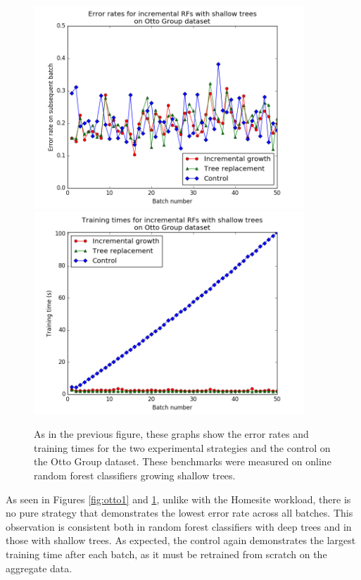 \begin{figure}
  \centering
  \includegraphics[width=4.0in]{otto1}\\
  \includegraphics[width=4.0in]{otto2}
  \caption{As in the previous figure, these graphs show the error rates and
    training times for the two experimental strategies and the control on the
    Otto Group dataset. These benchmarks were measured on online random forest
  classifiers growing shallow trees.}
  \label{fig:otto2}
\end{figure}

As seen in Figures \ref{fig:otto1} and \ref{fig:otto2}, unlike with the Homesite
workload, there is no pure strategy that demonstrates the lowest error rate
across all batches. This observation is consistent both in random forest
classifiers with deep trees and in those with shallow trees. As expected, the
control again demonstrates the largest training time after each batch, as it
must be retrained from scratch on the aggregate data. 

